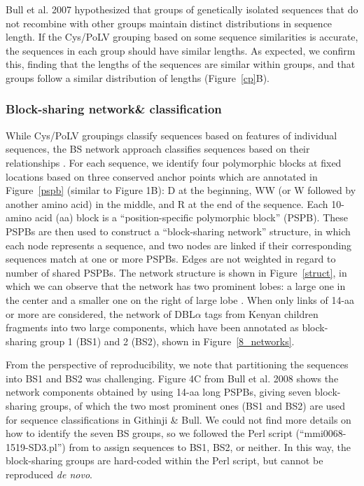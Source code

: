 \documentclass[10pt,twocolumn,superscriptaddress]{revtex4-1}
\newcommand{\dbla}{{DBL$\alpha$}\xspace}
\newcommand{\cp}{{Cys/PoLV}\xspace}
\newcommand{\paper}{{Githinji \& Bull}\xspace}
\begin{document}
Bull et al. 2007 \cite{bull2007} hypothesized that groups of genetically isolated sequences that do not recombine with other groups maintain distinct distributions in sequence length. If the \cp grouping based on some sequence similarities is accurate, the sequences in each group should have similar lengths. As expected, we confirm this, finding that the lengths of the sequences are similar within groups, and that groups follow a similar distribution of lengths (Figure~\ref{cp}B).   


\subsubsection{Block-sharing network\& classification}

While \cp groupings classify sequences based on features of individual sequences, the BS network approach classifies sequences based on their relationships \cite{bull2008}. For each sequence, we identify four polymorphic blocks at fixed locations based on three conserved anchor points which are annotated in Figure~\ref{pspb} (similar to \cite{bull2008} Figure 1B): D at the beginning, WW (or W followed by another amino acid) in the middle, and R at the end of the sequence. Each 10-amino acid (aa) block is a ``position-specific polymorphic block'' (PSPB). These PSPBs are then used to construct a ``block-sharing network'' structure, in which each node represents a sequence, and two nodes are linked if their corresponding sequences match at one or more PSPBs. Edges are not weighted in regard to number of shared PSPBs. The network structure is shown in Figure~\ref{struct}, in which we can observe that the network has two prominent lobes: a large one in the center and a smaller one on the right of large lobe \cite{bull2008} \cite{githinji2017}. When only links of 14-aa or more are considered, the network of \dbla tags from Kenyan children \cite{bull2008} fragments into two large components, which have been annotated as block-sharing group 1 (BS1) and 2 (BS2), shown in Figure~\ref{8_networks}.  


From the perspective of reproducibility, we note that partitioning the sequences into BS1 and BS2 was challenging. Figure 4C from Bull et al. 2008 \cite{bull2008} shows the network components obtained by using 14-aa long PSPBs, giving seven block-sharing groups, of which the two most prominent ones (BS1 and BS2) are used for sequence classifications in \paper. We could not find more details on how to identify the seven BS groups, so we followed the Perl script (``mmi0068-1519-SD3.pl'') from \cite{bull2008} to assign sequences to BS1, BS2, or neither. In this way, the block-sharing groups are hard-coded within the Perl script, but cannot be reproduced \textit{de novo}.  
\end{document}
